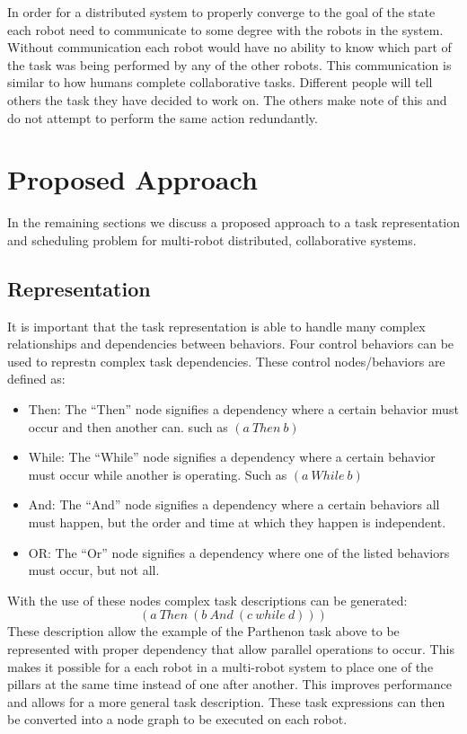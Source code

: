\documentclass[conference]{IEEEtran}
\begin{document}
In order for a distributed system to properly converge to the goal of the state each robot need to communicate to some degree with the robots in the system. Without communication each robot would have no ability to know which part of the task was being performed by any of the other robots. This communication is similar to how humans complete collaborative tasks. Different people will tell others the task they have decided to work on. The others make note of this and do not attempt to perform the same action redundantly.

\section{Proposed Approach}
In the remaining sections we discuss a proposed approach to a task representation and scheduling problem for multi-robot distributed, collaborative systems.

\subsection{Representation}
It is important that the task representation is able to handle many complex relationships and dependencies between behaviors. Four control behaviors can be used to represtn complex task dependencies. These control nodes/behaviors are defined as:
\begin{itemize}
\item Then: The ``Then'' node signifies a dependency where a certain behavior must occur and then another can. such as $(a~Then~b)$
\item While: The ``While'' node signifies a dependency where a certain behavior must occur while another is operating. Such as $(a~While~b)$
\item And: The ``And'' node signifies a dependency where a certain behaviors all must happen, but the order and time at which they happen is independent.
\item OR: The ``Or'' node signifies a dependency where one of the listed behaviors must occur, but not all.
\end{itemize}
With the use of these nodes complex task descriptions can be generated:
$$(a~Then~(b~And~(c~while~d)))$$
These description allow the example of the Parthenon task above to be represented with proper dependency that allow parallel operations to occur. This makes it possible for a each robot in a multi-robot system to place one of the pillars at the same time instead of one after another. This improves performance and allows for a more general task description. These task expressions can then be converted into a node graph to be executed on each robot.
\end{document}
